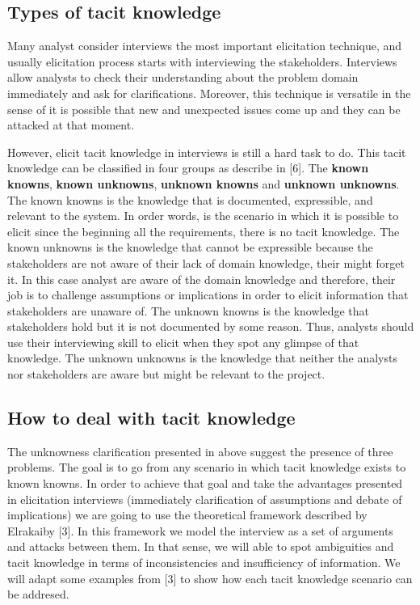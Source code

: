 \documentclass[]{llncs}
\begin{document}
\hypertarget{types-of-tacit-knowledge}{%
\subsection{Types of tacit knowledge}\label{types-of-tacit-knowledge}}

Many analyst consider interviews the most important elicitation
technique, and usually elicitation process starts with interviewing the
stakeholders. Interviews allow analysts to check their understanding
about the problem domain immediately and ask for clarifications.
Moreover, this technique is versatile in the sense of it is possible
that new and unexpected issues come up and they can be attacked at that
moment.

However, elicit tacit knowledge in interviews is still a hard task to
do. This tacit knowledge can be classified in four groups as describe in
{[}6{]}. The \textbf{known knowns}, \textbf{known unknowns},
\textbf{unknown knowns} and \textbf{unknown unknowns}. The known knowns
is the knowledge that is documented, expressible, and relevant to the
system. In order words, is the scenario in which it is possible to
elicit since the beginning all the requirements, there is no tacit
knowledge. The known unknowns is the knowledge that cannot be
expressible because the stakeholders are not aware of their lack of
domain knowledge, their might forget it. In this case analyst are aware
of the domain knowledge and therefore, their job is to challenge
assumptions or implications in order to elicit information that
stakeholders are unaware of. The unknown knowns is the knowledge that
stakeholders hold but it is not documented by some reason. Thus,
analysts should use their interviewing skill to elicit when they spot
any glimpse of that knowledge. The unknown unknowns is the knowledge
that neither the analysts nor stakeholders are aware but might be
relevant to the project.

\hypertarget{how-to-deal-with-tacit-knowledge}{%
\subsection{How to deal with tacit
knowledge}\label{how-to-deal-with-tacit-knowledge}}

The unknowness clarification presented in above suggest the presence of
three problems. The goal is to go from any scenario in which tacit
knowledge exists to known knowns. In order to achieve that goal and take
the advantages presented in elicitation interviews (immediately
clarification of assumptions and debate of implications) we are going to
use the theoretical framework described by Elrakaiby {[}3{]}. In this
framework we model the interview as a set of arguments and attacks
between them. In that sense, we will able to spot ambiguities and tacit
knowledge in terms of inconsistencies and insufficiency of information.
We will adapt some examples from {[}3{]} to show how each tacit
knowledge scenario can be addresed.
\end{document}
